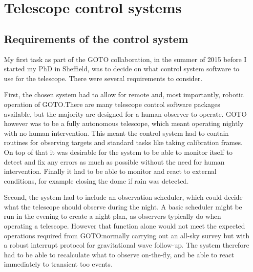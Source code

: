 \section{Telescope control systems}
\label{sec:control_systems}
\begin{colsection}


\begin{colsection}


\end{colsection}


\subsection{Requirements of the control system}
\label{sec:control_requirements}
\begin{colsection}

My first task as part of the GOTO collaboration, in the summer of 2015 before I started my PhD in Sheffield, was to decide on what control system software to use for the telescope. There were several requirements to consider.

First, the chosen system had to allow for remote and, most importantly, robotic operation of GOTO.\@ There are many telescope control software packages available, but the majority are designed for a human observer to operate. GOTO however was to be a fully autonomous telescope, which meant operating nightly with no human intervention. This meant the control system had to contain routines for observing targets and standard tasks like taking calibration frames. On top of that it was desirable for the system to be able to monitor itself to detect and fix any errors as much as possible without the need for human intervention. Finally it had to be able to monitor and react to external conditions, for example closing the dome if rain was detected.

Second, the system had to include an observation scheduler, which could decide what the telescope should observe during the night. A basic scheduler might be run in the evening to create a night plan, as observers typically do when operating a telescope. However that function alone would not meet the expected operations required from GOTO:\@ normally carrying out an all-sky survey but with a robust interrupt protocol for gravitational wave follow-up. The system therefore had to be able to recalculate what to observe on-the-fly, and be able to react immediately to transient \gls{too} events.


\end{colsection}
\end{colsection}
